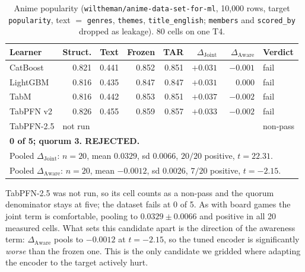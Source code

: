 \documentclass[10pt,letterpaper]{article}
\newcommand{\dj}{\Delta_{\mathrm{Joint}}}
\newcommand{\da}{\Delta_{\mathrm{Aware}}}
\begin{document}
\begin{table}[H]
\centering\small
\caption{Anime popularity (\texttt{wiltheman/anime-data-set-for-ml}, 10{,}000 rows, target
\texttt{popularity}, text $=$ \texttt{genres}, \texttt{themes}, \texttt{title\_english};
\texttt{members} and \texttt{scored\_by} dropped as leakage). 80 cells on one T4.}
\begin{tabular}{lrrrrrrl}
\toprule
Learner & Struct. & Text & Frozen & TAR & $\dj$ & $\da$ & Verdict \\
\midrule
CatBoost   & 0.821 & 0.441 & 0.852 & 0.851 & $+0.031$ & $-0.001$ & fail \\
LightGBM   & 0.816 & 0.435 & 0.847 & 0.847 & $+0.031$ & $\phantom{-}0.000$ & fail \\
TabM       & 0.816 & 0.442 & 0.853 & 0.851 & $+0.037$ & $-0.002$ & fail \\
TabPFN v2  & 0.826 & 0.455 & 0.859 & 0.857 & $+0.033$ & $-0.002$ & fail \\
TabPFN-2.5 & \multicolumn{6}{l}{not run} & non-pass \\
\midrule
\multicolumn{8}{l}{\textbf{0 of 5; quorum 3. REJECTED.}} \\
\multicolumn{8}{l}{Pooled $\dj$: $n{=}20$, mean $0.0329$, sd $0.0066$, $20/20$ positive, $t = 22.31$.} \\
\multicolumn{8}{l}{Pooled $\da$: $n{=}20$, mean $-0.0012$, sd $0.0026$, $7/20$ positive, $t = -2.15$.} \\
\bottomrule
\end{tabular}
\end{table}

\noindent TabPFN-2.5 was not run, so its cell counts as a non-pass and the quorum denominator stays at
five; the dataset fails at 0 of 5. As with board games the joint term is comfortable, pooling
to $0.0329 \pm 0.0066$ and positive in all 20 measured cells. What sets this candidate apart is
the direction of the awareness term: $\da$ pools to $-0.0012$ at $t = -2.15$, so the tuned
encoder is significantly \emph{worse} than the frozen one. This is the only candidate we
gridded where adapting the encoder to the target actively hurt.
\end{document}
